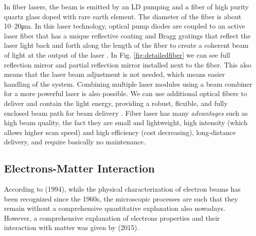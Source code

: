 In fiber lasers, the beam is emitted by an LD pumping and a fiber of high purity  quartz glass doped with  rare earth element. The diameter of the fiber is about \numrange[range-phrase=--]{10}{20}\unit{\micro\metre}. In this laser technology, optical pump diodes are coupled to an active laser fiber that has a unique reflective coating and Bragg gratings that reflect the laser light back and forth along the length of the fiber to create a coherent beam of light at the output of the laser \cite{milewski_additive_2017}. In Fig. \ref{fig:detailedfiber} we can see full reflection mirror and partial reflection mirror installed next to the fiber. This also means that the laser beam adjustment is not needed, which means easier handling of the system. Combining multiple laser modules using a beam combiner for a more powerful laser is also possible. We can use additional optical fibers to deliver and contain the light energy, providing a robust, flexible, and fully enclosed beam path for beam delivery \cite{milewski_additive_2017}. Fiber laser has many \textit{advantages} such as high beam quality, the fact they are small and lightweight, high intensity (which allows higher scan speed) and high efficiency (cost decreasing), long-distance delivery, and require basically no maintenance. 
\subsection{Electrons-Matter Interaction}
\label{subsec:ebminter}
According to \citeauthor{schultz_h_electron_1994} (1994), while the physical characterization of electron beams has been recognized since the 1960s, the microscopic processes are such that they remain without a comprehensive quantitative explanation also nowadays. However, a comprehensive explanation of electrons properties and their interaction with matter was given by \citeauthor{krumeich_properties_2015} (2015).
